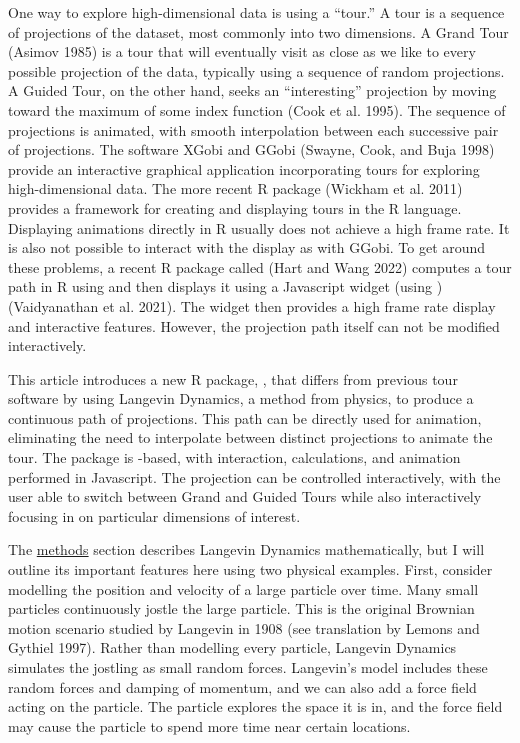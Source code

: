 One way to explore high-dimensional data is using a ``tour.'' A tour is a sequence of projections of the dataset, most commonly into two dimensions. A Grand Tour (Asimov 1985) is a tour that will eventually visit as close as we like to every possible projection of the data, typically using a sequence of random projections. A Guided Tour, on the other hand, seeks an ``interesting'' projection by moving toward the maximum of some index function (Cook et al. 1995). The sequence of projections is animated, with smooth interpolation between each successive pair of projections. The software XGobi and GGobi (Swayne, Cook, and Buja 1998) provide an interactive graphical application incorporating tours for exploring high-dimensional data. The more recent R package  (Wickham et al. 2011) provides a framework for creating and displaying tours in the R language. Displaying animations directly in R usually does not achieve a high frame rate. It is also not possible to interact with the display as with GGobi. To get around these problems, a recent R package called  (Hart and Wang 2022) computes a tour path in R using  and then displays it using a Javascript widget (using ) (Vaidyanathan et al. 2021). The widget then provides a high frame rate display and interactive features. However, the projection path itself can not be modified interactively.

This article introduces a new R package, , that differs from previous tour software by using Langevin Dynamics, a method from physics, to produce a continuous path of projections. This path can be directly used for animation, eliminating the need to interpolate between distinct projections to animate the tour. The package is -based, with interaction, calculations, and animation performed in Javascript. The projection can be controlled interactively, with the user able to switch between Grand and Guided Tours while also interactively focusing in on particular dimensions of interest.

The \protect\hyperlink{langevindynamics}{methods} section describes Langevin Dynamics mathematically, but I will outline its important features here using two physical examples. First, consider modelling the position and velocity of a large particle over time. Many small particles continuously jostle the large particle. This is the original Brownian motion scenario studied by Langevin in 1908 (see translation by Lemons and Gythiel 1997). Rather than modelling every particle, Langevin Dynamics simulates the jostling as small random forces. Langevin's model includes these random forces and damping of momentum, and we can also add a force field acting on the particle. The particle explores the space it is in, and the force field may cause the particle to spend more time near certain locations.

